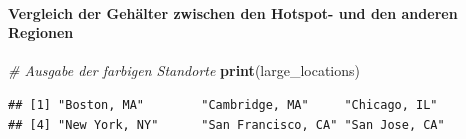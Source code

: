 \documentclass[
]{article}
\newenvironment{Shaded}{\begin{snugshade}}{\end{snugshade}}
\newcommand{\CommentTok}[1]{\textcolor[rgb]{0.56,0.35,0.01}{\textit{#1}}}
\newcommand{\FunctionTok}[1]{\textcolor[rgb]{0.13,0.29,0.53}{\textbf{#1}}}
\newcommand{\NormalTok}[1]{#1}
\begin{document}
\paragraph{Vergleich der Gehälter zwischen den Hotspot- und den anderen
Regionen}\label{vergleich-der-gehuxe4lter-zwischen-den-hotspot--und-den-anderen-regionen}

\begin{Shaded}
\begin{Highlighting}[]
\CommentTok{\# Ausgabe der farbigen Standorte}
\FunctionTok{print}\NormalTok{(large\_locations)}
\end{Highlighting}
\end{Shaded}

\begin{verbatim}
## [1] "Boston, MA"        "Cambridge, MA"     "Chicago, IL"      
## [4] "New York, NY"      "San Francisco, CA" "San Jose, CA"
\end{verbatim}
\end{document}
